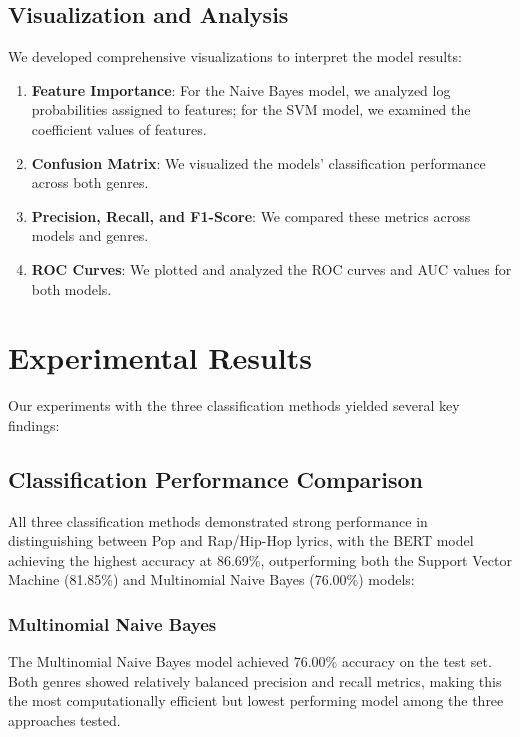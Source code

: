 \documentclass[conference]{IEEEtran}
\begin{document}
\subsection{Visualization and Analysis}
We developed comprehensive visualizations to interpret the model results:
\begin{enumerate}
\item \textbf{Feature Importance}: For the Naive Bayes model, we analyzed log probabilities assigned to features; for the SVM model, we examined the coefficient values of features.
\item \textbf{Confusion Matrix}: We visualized the models' classification performance across both genres.
\item \textbf{Precision, Recall, and F1-Score}: We compared these metrics across models and genres.
\item \textbf{ROC Curves}: We plotted and analyzed the ROC curves and AUC values for both models.
\end{enumerate}

\section{Experimental Results}
Our experiments with the three classification methods yielded several key findings:

\subsection{Classification Performance Comparison}
All three classification methods demonstrated strong performance in distinguishing between Pop and Rap/Hip-Hop lyrics, with the BERT model achieving the highest accuracy at 86.69\%, outperforming both the Support Vector Machine (81.85\%) and Multinomial Naive Bayes (76.00\%) models:

\subsubsection{Multinomial Naive Bayes}
The Multinomial Naive Bayes model achieved 76.00\% accuracy on the test set. Both genres showed relatively balanced precision and recall metrics, making this the most computationally efficient but lowest performing model among the three approaches tested.
\end{document}
